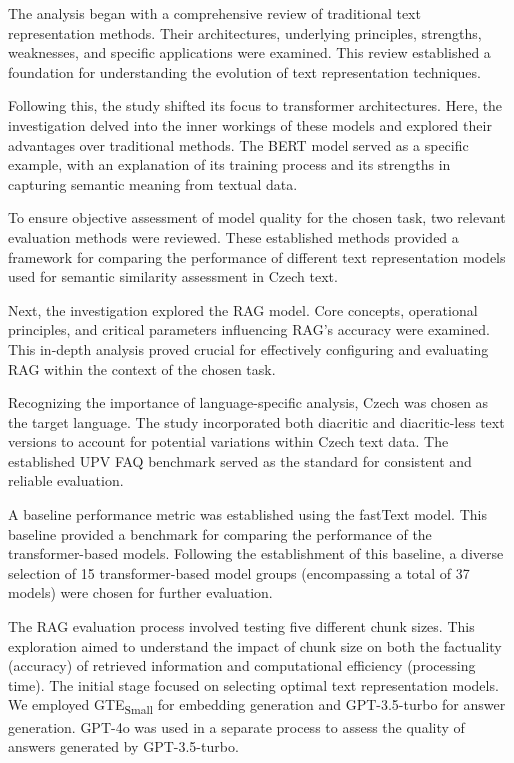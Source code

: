 The analysis began with a comprehensive review of traditional text representation methods.
Their architectures, underlying principles, strengths, weaknesses, and specific applications were examined.
This review established a foundation for understanding the evolution of text representation techniques.

Following this, the study shifted its focus to transformer architectures.
Here, the investigation delved into the inner workings of these models and explored their advantages over traditional methods.
The \ac{BERT} model served as a specific example, with an explanation of its training process and its strengths in capturing semantic meaning from textual data.

To ensure objective assessment of model quality for the chosen task, two relevant evaluation methods were reviewed.
These established methods provided a framework for comparing the performance of different text representation models used for semantic similarity assessment in Czech text.

Next, the investigation explored the \ac{RAG} model.
Core concepts, operational principles, and critical parameters influencing \ac{RAG}'s accuracy were examined.
This in-depth analysis proved crucial for effectively configuring and evaluating \ac{RAG} within the context of the chosen task.

Recognizing the importance of language-specific analysis, Czech was chosen as the target language.
The study incorporated both diacritic and diacritic-less text versions to account for potential variations within Czech text data.
The established UPV FAQ benchmark served as the standard for consistent and reliable evaluation.

A baseline performance metric was established using the fastText model.
This baseline provided a benchmark for comparing the performance of the transformer-based models.
Following the establishment of this baseline, a diverse selection of 15 transformer-based model groups (encompassing a total of 37 models) were chosen for further evaluation.

The \ac{RAG} evaluation process involved testing five different chunk sizes.
This exploration aimed to understand the impact of chunk size on both the factuality (accuracy) of retrieved information and computational efficiency (processing time).
The initial stage focused on selecting optimal text representation models.
We employed \ac{GTE}\textsubscript{Small} for embedding generation and GPT-3.5-turbo for answer generation.
GPT-4o was used in a separate process to assess the quality of answers generated by GPT-3.5-turbo.


